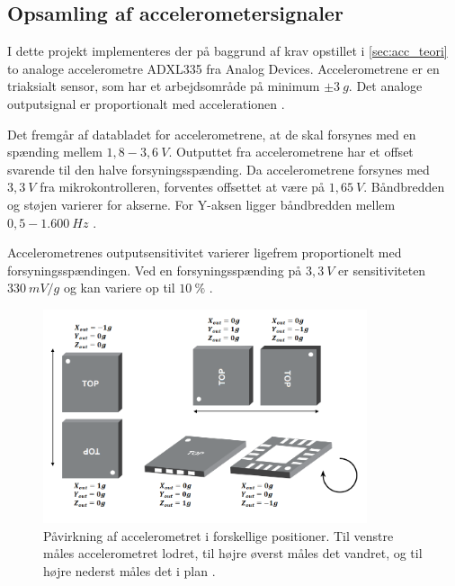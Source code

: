 \subsection{Opsamling af accelerometersignaler}\label{sec:acc_imp}

I dette projekt implementeres der på baggrund af krav opstillet i \autoref{sec:acc_teori} to analoge accelerometre ADXL335 fra Analog Devices. 
Accelerometrene er en triaksialt sensor, som har et arbejdsområde på minimum $\pm3~g$. 
Det analoge outputsignal er proportionalt med accelerationen \citep{analogdevices2009}. 

Det fremgår af databladet for accelerometrene, at de skal forsynes med en spænding mellem $1,8-3,6~V$. 
Outputtet fra accelerometrene har et offset svarende til den halve forsyningsspænding. 
Da accelerometrene forsynes med $3,3~V$ fra mikrokontrolleren, forventes offsettet at være på $1,65~V$. 
Båndbredden og støjen varierer for akserne. 
For Y-aksen ligger båndbredden mellem $0,5 - 1.600~Hz$ \citep{analogdevices2010}. %

Accelerometrenes outputsensitivitet varierer ligefrem proportionelt med forsyningsspændingen. 
Ved en forsyningsspænding på $3,3~V$ er sensitiviteten $330~mV/g$ og kan variere op til $ 10~\%$ \citep{analogdevices2010}. 

\begin{figure}[H]
\centering
\includegraphics[width=0.85\textwidth]{figures/acc_paavirkning}
\caption{Påvirkning af accelerometret i forskellige positioner. Til venstre måles accelerometret lodret, til højre øverst måles det vandret, og til højre nederst måles det i plan \citep{analogdevices2010}.}
\label{fig:acc}
\end{figure}


